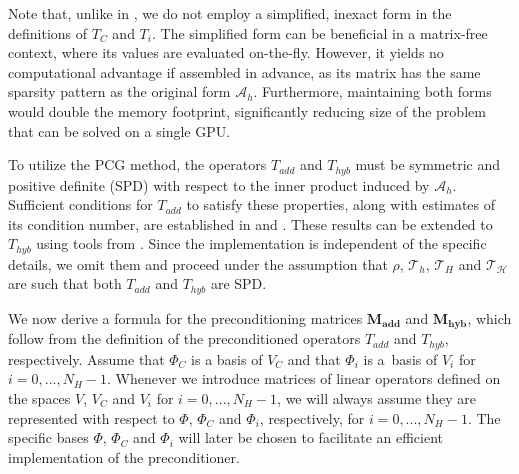 \documentclass[11pt]{article}
\theoremstyle{definition}
\theoremstyle{theorem}
\begin{document}
Note that, unlike in \cite{Przykry}, we do not employ
a simplified, inexact form in the definitions of $T_C$ and $T_i$.
The simplified form can be beneficial in a matrix\nobreakdash-free
context, where its values are evaluated on-the-fly. However, it yields no
computational advantage if assembled in advance,
as its matrix has the same sparsity
pattern as the original form $\mathcal{A}_h$. Furthermore, maintaining both forms
would double the memory footprint, significantly reducing size of the problem
that can be solved on a single GPU.

To utilize the PCG method, the operators $T_{add}$ and $T_{hyb}$ must be
symmetric and positive definite (SPD) with respect to the inner product induced
by $\mathcal{A}_h$. Sufficient conditions for $T_{add}$ to satisfy these properties,
along with estimates of its condition number, are established in \cite{Przykry}
and \cite{Przykry-hp}. These results can be extended to $T_{hyb}$ using tools
from \cite{toselli}. Since the implementation is independent of the specific
details, we omit them and proceed under the assumption that $\rho$, $\mathcal{T}_h$,
$\mathcal{T}_H$ and $\mathcal{T}_{\mathcal{H}}$ are such that
both $T_{add}$ and $T_{hyb}$ are SPD.

We now derive a formula for the preconditioning matrices $\bm{M_{add}}$ and
$\bm{M_{hyb}}$, which follow from the definition of the preconditioned operators
$T_{add}$ and $T_{hyb}$, respectively.
Assume that $\Phi_C$ is a basis of $V_C$ and that $\Phi_i$ is a~basis of $V_i$ for
$i=0,...,N_H-1$. Whenever we introduce matrices of
linear operators defined on the spaces $V$, $V_C$ and $V_i$ for $i=0,...,N_H-1$, we will
always assume they are represented with respect to $\Phi$, $\Phi_C$ and $\Phi_i$,
respectively, for $i=0,...,N_H-1$. The specific bases $\Phi$, $\Phi_C$ and $\Phi_i$ will later
be chosen to facilitate an efficient implementation of the preconditioner.
\end{document}
